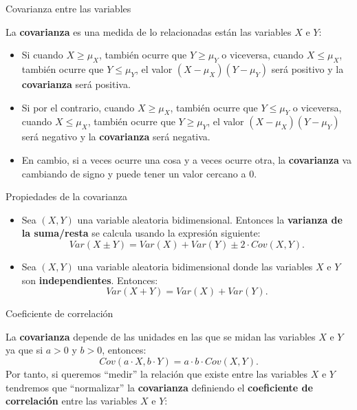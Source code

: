 \documentclass[ignorenonframetext,]{beamer}
\begin{document}
\begin{frame}{Covarianza entre las variables}
\protect\hypertarget{covarianza-entre-las-variables}{}

La \textbf{covarianza} es una medida de lo relacionadas están las
variables \(X\) e \(Y\):

\begin{itemize}
\item
  Si cuando \(X\geq \mu_X\), también ocurre que \(Y\geq \mu_Y\) o
  viceversa, cuando \(X\leq \mu_X\), también ocurre que \(Y\leq \mu_Y\),
  el valor \((X-\mu_X)(Y-\mu_Y)\) será positivo y la \textbf{covarianza}
  será positiva.
\item
  Si por el contrario, cuando \(X\geq \mu_X\), también ocurre que
  \(Y\leq \mu_Y\) o viceversa, cuando \(X\leq \mu_X\), también ocurre
  que \(Y\geq \mu_Y\), el valor \((X-\mu_X)(Y-\mu_Y)\) será negativo y
  la \textbf{covarianza} será negativa.
\item
  En cambio, si a veces ocurre una cosa y a veces ocurre otra, la
  \textbf{covarianza} va cambiando de signo y puede tener un valor
  cercano a 0.
\end{itemize}

\end{frame}

\begin{frame}{Propiedades de la covarianza}
\protect\hypertarget{propiedades-de-la-covarianza}{}

\begin{itemize}
\item
  Sea \((X,Y)\) una variable aleatoria bidimensional. Entonces la
  \textbf{varianza de la suma/resta} se calcula usando la expresión
  siguiente: \[
  Var(X\pm Y)=Var(X)+Var(Y)\pm 2\cdot Cov(X,Y).
  \]
\item
  Sea \((X,Y)\) una variable aleatoria bidimensional donde las variables
  \(X\) e \(Y\) son \textbf{independientes}. Entonces: \[
  Var(X+Y)=Var(X)+Var(Y).
  \]
\end{itemize}

\end{frame}

\begin{frame}{Coeficiente de correlación}
\protect\hypertarget{coeficiente-de-correlaciuxf3n}{}

La \textbf{covarianza} depende de las unidades en las que se midan las
variables \(X\) e \(Y\) ya que si \(a>0\) y \(b>0\), entonces: \[
Cov(a\cdot X,b\cdot Y)=a\cdot b\cdot Cov(X,Y).
\] Por tanto, si queremos ``medir'' la relación que existe entre las
variables \(X\) e \(Y\) tendremos que ``normalizar'' la
\textbf{covarianza} definiendo el \textbf{coeficiente de correlación}
entre las variables \(X\) e \(Y\):

\end{frame}
\end{document}
